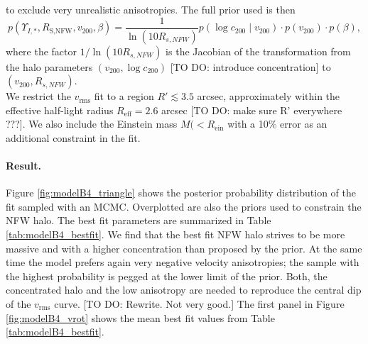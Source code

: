 to exclude very unrealistic anisotropies. The full prior used is then
\begin{equation*}
p(\Upsilon_{I,*},R_\text{S,NFW},v_{200},\beta) = \frac{1}{\ln\left( 10 R_{s,NFW}\right)} p(\log c_{200} \mid v_{200}) \cdot p(v_{200}) \cdot p(\beta), 
\end{equation*}
where the factor $1/\ln\left( 10 R_{s,NFW}\right)$ is the Jacobian of the transformation from the halo parameters $(v_{200},\log c_{200})$ [TO DO: introduce concentration] to $(v_{200},R_{s,NFW})$.
\\We restrict the $v_\text{rms}$ fit to a region $R' \lesssim 3.5$ arcsec, approximately within the effective half-light radius $R_\text{eff} = 2.6$ arcsec  [TO DO: make sure R' everywhere ???]. We also include the Einstein mass $M(<R_\text{ein}$ with a 10\% error as an additional constraint in the fit. 


\paragraph{Result.} Figure \ref{fig:modelB4_triangle} shows the posterior probability distribution of the fit sampled with an MCMC. Overplotted are also the priors used to constrain the NFW halo. The best fit parameters are summarized in Table \ref{tab:modelB4_bestfit}. We find that the best fit NFW halo strives to be more massive and with a higher concentration than  proposed by the prior. At the same time the model prefers again very negative velocity anisotropies; the sample with the highest probability is pegged at the lower limit of the prior. Both, the concentrated halo and the low anisotropy are needed to reproduce the central dip of the $v_\text{rms}$ curve. [TO DO: Rewrite. Not very good.]
The first panel in Figure \ref{fig:modelB4_vrot} shows the mean best fit values from Table \ref{tab:modelB4_bestfit}.

